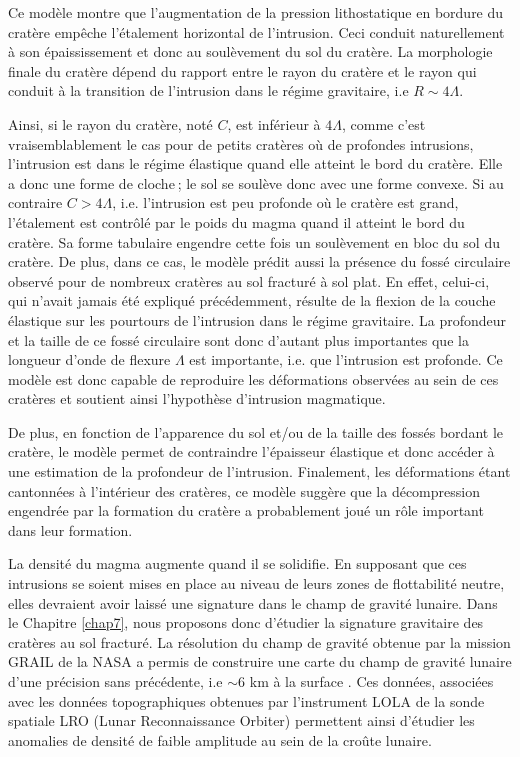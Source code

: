 Ce modèle montre que l’augmentation de la pression lithostatique en
bordure du cratère empêche l’étalement horizontal de l’intrusion. Ceci
conduit naturellement à son épaississement et donc au soulèvement du
sol du cratère. La morphologie finale du cratère dépend du rapport
entre le rayon du cratère et le rayon qui conduit à la transition de
l’intrusion dans le régime gravitaire, i.e $R\sim 4\Lambda$.

Ainsi, si le rayon du cratère, noté $C$, est inférieur à $4\Lambda$,
comme c’est vraisemblablement le cas pour de petits cratères où de
profondes intrusions, l’intrusion est dans le régime élastique quand
elle atteint le bord du cratère. Elle a donc une forme de cloche ; le
sol se soulève donc avec une forme convexe. Si au contraire
$C>4\Lambda$, i.e. l’intrusion est peu profonde où le cratère est
grand, l’étalement est contrôlé par le poids du magma quand il atteint
le bord du cratère. Sa forme tabulaire engendre cette fois un
soulèvement en bloc du sol du cratère. De plus, dans ce cas, le modèle
prédit aussi la présence du fossé circulaire observé pour de nombreux
cratères au sol fracturé à sol plat. En effet, celui-ci, qui n’avait
jamais été expliqué précédemment, résulte de la flexion de la couche
élastique sur les pourtours de l’intrusion dans le régime gravitaire.
La profondeur et la taille de ce fossé circulaire sont donc d’autant
plus importantes que la longueur d’onde de flexure $\Lambda$ est
importante, i.e. que l’intrusion est profonde. Ce modèle est donc
capable de reproduire les déformations observées au sein de ces
cratères et soutient ainsi l’hypothèse d’intrusion magmatique.

De plus, en fonction de l’apparence du sol et/ou de la taille des
fossés bordant le cratère, le modèle permet de contraindre l’épaisseur
élastique et donc accéder à une estimation de la profondeur de
l’intrusion. Finalement, les déformations étant cantonnées à
l’intérieur des cratères, ce modèle suggère que la décompression
engendrée par la formation du cratère a probablement joué un rôle
important dans leur formation.

La densité du magma augmente quand il se solidifie. En supposant que
ces intrusions se soient mises en place au niveau de leurs zones de
flottabilité neutre, elles devraient avoir laissé une signature dans
le champ de gravité lunaire. Dans le Chapitre \ref{chap7}, nous
proposons donc d’étudier la signature gravitaire des cratères au sol
fracturé. La résolution du champ de gravité obtenue par la mission
GRAIL de la NASA a permis de construire une carte du champ de gravité
lunaire d’une précision sans précédente, i.e $\sim 6$ km à la surface
\citep{Zuber:2013cp}. Ces données, associées avec les données
topographiques obtenues par l’instrument LOLA de la sonde spatiale LRO
(Lunar Reconnaissance Orbiter) permettent ainsi d’étudier les
anomalies de densité de faible amplitude au sein de la croûte lunaire.

